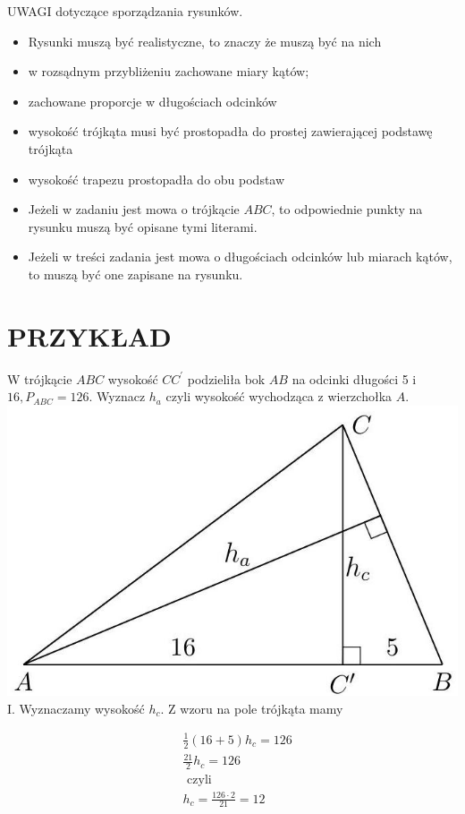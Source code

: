 \documentclass[10pt]{article}
\begin{document}
UWAGI dotyczące sporządzania rysunków.

\begin{itemize}
  \item Rysunki muszą być realistyczne, to znaczy że muszą być na nich
  \item w rozsądnym przybliżeniu zachowane miary kątów;
  \item zachowane proporcje w długościach odcinków
  \item wysokość trójkąta musi być prostopadła do prostej zawierającej podstawę trójkąta
  \item wysokość trapezu prostopadła do obu podstaw
  \item Jeżeli w zadaniu jest mowa o trójkącie \(A B C\), to odpowiednie punkty na rysunku muszą być opisane tymi literami.
  \item Jeżeli w treści zadania jest mowa o długościach odcinków lub miarach kątów, to muszą być one zapisane na rysunku.
\end{itemize}

\section*{PRZYKŁAD}
W trójkącie \(A B C\) wysokość \(C C^{\prime}\) podzieliła bok \(A B\) na odcinki długości 5 i \(16, P_{A B C}=126\). Wyznacz \(h_{a}\) czyli wysokość wychodząca z wierzchołka \(A\).\\
\includegraphics[max width=\textwidth, center]{2024_11_21_71f62bd117d375398909g-126}\\
I. Wyznaczamy wysokość \(h_{c}\). Z wzoru na pole trójkąta mamy

\[
\begin{aligned}
& \frac{1}{2}(16+5) h_{c}=126 \\
& \frac{21}{2} h_{c}=126 \\
& \text { czyli } \\
& h_{c}=\frac{126 \cdot 2}{21}=12
\end{aligned}
\]
\end{document}
